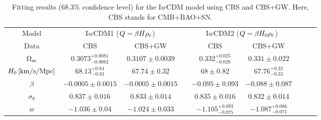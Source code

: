 \documentclass[aps,prd,nofootinbib,amsmath,amssymb,superscriptaddress,twocolumn,10pt]{revtex4}%
\begin{document}
\begin{table}\small
\setlength\tabcolsep{2pt}
\renewcommand{\arraystretch}{1.5}
\centering
\caption{\label{tab2}Fitting results (68.3\% confidence level) for the I$w$CDM model using CBS and CBS+GW. Here, CBS stands for CMB+BAO+SN.}
\begin{tabular}{ccccccccc}


\hline Model &\multicolumn{2}{c}{I$w$CDM1 ($Q=\beta H\rho_{\rm c}$)}&&\multicolumn{2}{c}{I$w$CDM2 ($Q=\beta H_{0}\rho_{\rm c}$)}\\
           \cline{2-3}\cline{5-6}
       Data  & CBS&CBS+GW &&CBS&CBS+GW\\

\hline
$\Omega_{\rm m}$                         &$0.3073^{+0.0081}_{-0.0082}$
                                         &$ 0.3107\pm0.0039$
                                         &&$0.332^{+0.025}_{-0.028}$
                                         &$0.331\pm0.022$\\

$H_0\,[{\rm km}/{\rm s}/{\rm Mpc}]$      &$68.13^{+0.84}_{-0.83}$
                                         &$67.74\pm0.32$
                                         &&$68\pm0.82$
                                         &$67.76^{+0.32}_{-0.33}$\\

$\beta$                                  &$-0.0005\pm0.0015$
                                         &$-0.0005\pm0.0015$
                                         &&$-0.095\pm0.093$
                                         &$-0.088\pm0.087$\\

$\sigma_{8}$                             &$0.837\pm0.016$
                                         &$0.833\pm0.014$
                                         &&$0.835\pm0.016$
                                         &$0.832\pm0.014$\\

$w$                                      &$-1.036\pm0.04$
                                         &$-1.024\pm0.033$
                                         &&$-1.105^{+0.093}_{-0.075}$
                                         &$-1.087^{+0.086}_{-0.071}$\\


\hline
\end{tabular}

\end{table}
\end{document}
